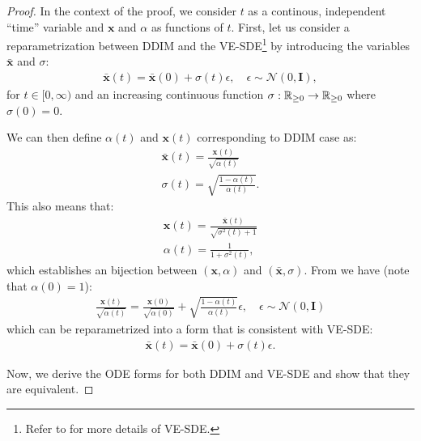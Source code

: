 \begin{proof}
In the context of the proof, we consider $t$ as a continous, independent ``time'' variable and $\bm{x}$ and $\alpha$ as functions of $t$. First, let us consider a reparametrization between DDIM and the VE-SDE\footnote{Refer to \citep{song2020score} for more details of VE-SDE.} by introducing the variables $\bar{\bm{x}}$ and $\sigma$:
\begin{align}
    \bar{\bm{x}}(t) = \bar{\bm{x}}(0) + \sigma(t) \epsilon, \quad \epsilon \sim \mathcal{N}(0, \bm{I}),
\end{align}
for $t \in [0, \infty)$ and an increasing continuous function $\sigma: {\mathbb{R}}_{\geq 0} \to {\mathbb{R}}_{\geq 0}$ where $\sigma(0) = 0$. 

We can then define $\alpha(t)$ and $\bm{x}(t)$ corresponding to DDIM case as:
\begin{gather}
    \bar{\bm{x}}(t) = \frac{\bm{x}(t)}{\sqrt{\alpha(t)}} \\
    \sigma(t) = \sqrt{\frac{1 - \alpha(t)}{\alpha(t)}}.
\end{gather}
This also means that:
\begin{gather}
    \bm{x}(t) = \frac{\bar{\bm{x}}(t)}{\sqrt{\sigma^2(t) + 1}} \\
    \alpha(t) = \frac{1}{1 + \sigma^2(t)},
\end{gather}
which establishes an bijection between $(\bm{x}, \alpha)$ and $(\bar{\bm{x}}, \sigma)$. From  we have (note that $\alpha(0) = 1$):
\begin{align}
    \frac{\bm{x}(t)}{\sqrt{\alpha(t)}} = \frac{\bm{x}(0)}{\sqrt{\alpha(0)}} + \sqrt{\frac{1 - \alpha(t)}{\alpha(t)}} \epsilon, \quad \epsilon \sim \mathcal{N}(0, \bm{I})
\end{align}
which can be reparametrized into a form that is consistent with VE-SDE:
\begin{align}
    \bar{\bm{x}}(t) = \bar{\bm{x}}(0) + \sigma(t) \epsilon.
\end{align}

Now, we derive the ODE forms for both DDIM and VE-SDE and show that they are equivalent.


\end{proof}
